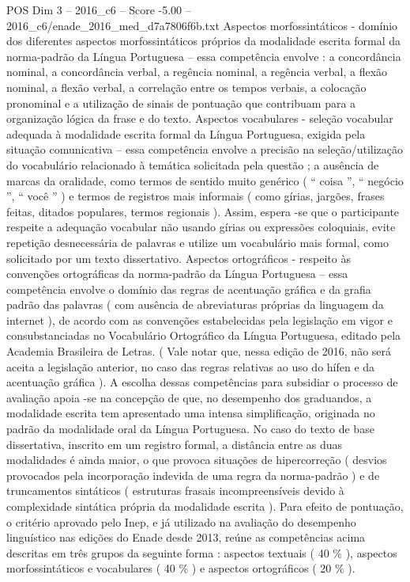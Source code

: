 \begin{textsample}{POS Dim 3 – 2016\_c6 – Score -5.00 – 2016\_c6/enade\_2016\_med\_d7a7806f6b.txt}
Aspectos morfossintáticos - domínio dos diferentes aspectos morfossintáticos próprios da modalidade escrita formal da norma-padrão da Língua Portuguesa – essa competência envolve : a concordância nominal, a concordância verbal, a regência nominal, a regência verbal, a flexão nominal, a flexão verbal, a correlação entre os tempos verbais, a colocação pronominal e a utilização de sinais de pontuação que contribuam para a organização lógica da frase e do texto.
Aspectos vocabulares - seleção vocabular adequada à modalidade escrita formal da Língua Portuguesa, exigida pela situação comunicativa – essa competência envolve a precisão na seleção/utilização do vocabulário relacionado à temática solicitada pela questão ; a ausência de marcas da oralidade, como termos de sentido muito genérico ( “ coisa ”, “ negócio ”, “ você ” ) e termos de registros mais informais ( como gírias, jargões, frases feitas, ditados populares, termos regionais ).
Assim, espera -se que o participante respeite a adequação vocabular não usando gírias ou expressões coloquiais, evite repetição desnecessária de palavras e utilize um vocabulário mais formal, como solicitado por um texto dissertativo.
Aspectos ortográficos - respeito às convenções ortográficas da norma-padrão da Língua Portuguesa – essa competência envolve o domínio das regras de acentuação gráfica e da grafia padrão das palavras ( com ausência de abreviaturas próprias da linguagem da internet ), de acordo com as convenções estabelecidas pela legislação em vigor e consubstanciadas no Vocabulário Ortográfico da Língua Portuguesa, editado pela Academia Brasileira de Letras. ( Vale notar que, nessa edição de 2016, não será aceita a legislação anterior, no caso das regras relativas ao uso do hífen e da acentuação gráfica ).
A escolha dessas competências para subsidiar o processo de avaliação apoia -se na concepção de que, no desempenho dos graduandos, a modalidade escrita tem apresentado uma intensa simplificação, originada no padrão da modalidade oral da Língua Portuguesa.
No caso do texto de base dissertativa, inscrito em um registro formal, a distância entre as duas modalidades é ainda maior, o que provoca situações de hipercorreção ( desvios provocados pela incorporação indevida de uma regra da norma-padrão ) e de truncamentos sintáticos ( estruturas frasais incompreensíveis devido à complexidade sintática própria da modalidade escrita ).
Para efeito de pontuação, o critério aprovado pelo Inep, e já utilizado na avaliação do desempenho linguístico nas edições do Enade desde 2013, reúne as competências acima descritas em três grupos da seguinte forma : aspectos textuais ( 40 \% ), aspectos morfossintáticos e vocabulares ( 40 \% ) e aspectos ortográficos ( 20 \% ).

\end{textsample}
